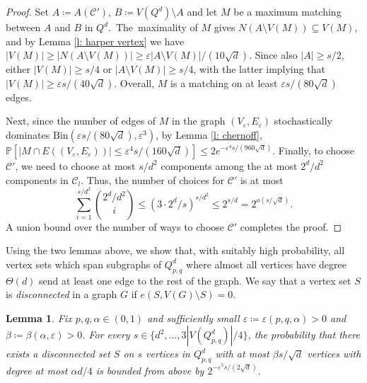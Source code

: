\documentclass{article}
\newtheorem{lemma}[thm]{Lemma}
\theoremstyle{definition}
\newcommand{\eps}{\varepsilon}
\newcommand{\cC}{\mathcal{C}}
\begin{document}
\begin{proof}
Set $A\coloneqq A(\cC')$,
$B\coloneqq V(Q^d)\setminus A$ and let $M$ be a maximum matching between $A$ and $B$ in $Q^d$.~The~maximality of $M$ gives $N(A\setminus V(M))\subseteq V(M)$, and by Lemma \ref{l: harper vertex} we have 
$|V(M)|\ge |N(A\setminus V(M))|\ge \eps|A\setminus V(M)|/(10\sqrt{d})$.
Since also $|A|\ge s/2$, either $|V(M)| \ge s/4$ or $|A\setminus V(M)|\ge s/4$, with the latter implying that $|V(M)|\ge \eps s/(40\sqrt{d})$. Overall, $M$ is a matching on at least $\eps s/(80\sqrt{d})$ edges. 

Next, since the number of edges of $M$ in the graph $(V_\eps,E_\eps)$ stochastically dominates $\mathrm{Bin}(\eps s/(80\sqrt{d}),\eps^3)$, by Lemma \ref{l: chernoff}, $\mathbb P[|M\cap E((V_\eps,E_\eps))|\le \eps^4s/(160\sqrt{d})]\le 2e^{-\eps^4s/(960\sqrt{d})}$.
Finally, to choose $\cC'$, we need to choose at most $s/d^2$ components 
among the at most $2^d/d^2$ components in $\cC_l$. Thus, the number of choices for $\cC'$ is at most
\[\sum_{i=1}^{s/d^2}\binom{2^d/d^2}{i}\le \left(3\cdot 2^d/s\right)^{s/d^2}\le 2^{s/d} = 2^{o(s/\sqrt{d})}.\]
A union bound over the number of ways to choose $\cC'$ completes the proof.
\end{proof}

Using the two lemmas above, we show that, with suitably high probability, all vertex sets which span subgraphs of $Q^d_{p,q}$ where almost all vertices have degree $\Theta(d)$ send at least one edge to the rest of the graph.
We say that a vertex set $S$ is \emph{disconnected} in a graph $G$ if $e(S,V(G)\setminus S)=0$.


\begin{lemma}\label{lem: sprinkling event}
Fix $p,q,\alpha\in (0,1)$ and sufficiently small $\eps\coloneqq \eps(p,q,\alpha)>0$ and $\beta\coloneqq \beta(\alpha, \eps)>0$. 
For every $s\in\{d^2,\ldots, 3|V(Q^d_{p,q})|/4\}$, the probability that there exists a disconnected set $S$ on $s$ vertices in $Q^d_{p,q}$ with at most $\beta s/\sqrt{d}$ vertices with degree at most $\alpha d/4$ is bounded from above by $2^{-\eps^5 s/(2\sqrt{d})}$.
\end{lemma}
\end{document}
